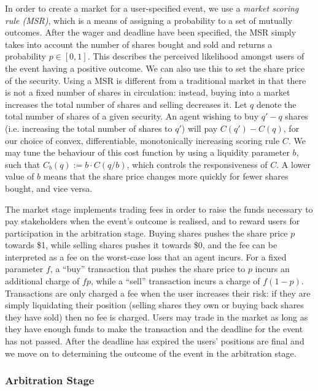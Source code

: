 \documentclass[10pt,a4paper]{article}
\theoremstyle{plain}
\theoremstyle{definition}
\begin{document}
In order to create a market for a user-specified event, we use a \emph{market
scoring rule (MSR)}, which is a means of assigning a probability to a set of
mutually outcomes. After the wager and deadline have been specified, the MSR
simply takes into account the number of shares bought and sold and returns a
probability $p \in [0,1]$. This describes the perceived likelihood amongst
users of the event having a positive outcome. We can also use this to set the
share price of the security.  Using a MSR is different from a traditional
market in that there is not a fixed number of shares in circulation: instead,
buying into a market increases the total number of shares and selling decreases
it. Let $q$ denote the total number of shares of a given security. An agent
wishing to buy $q'-q$ shares (i.e. increasing the total number of shares to
$q'$) will pay $C(q')-C(q)$, for our choice of convex, differentiable,
monotonically increasing scoring rule $C$. We may tune the behaviour of this
cost function by using a liquidity parameter $b$, such that $C_b(q) := b \cdot
C(q/b)$, which controls the responsiveness of $C$. A lower value of $b$ means
that the share price changes more quickly for fewer shares bought, and vice
versa.

The market stage implements trading fees in order to raise the funds necessary
to pay stakeholders when the event's outcome is realised, and to reward users
for participation in the arbitration stage. Buying shares pushes the share
price $p$ towards \$1, while selling shares pushes it towards \$0, and the fee
can be interpreted as a fee on the worst-case loss that an agent incurs. For a
fixed parameter $f$, a ``buy'' transaction that pushes the share price to $p$
incurs an additional charge of $fp$, while a ``sell'' transaction incurs a
charge of $f(1-p)$. Transactions are only charged a fee when the user increases
their risk: if they are simply liquidating their position (selling shares they
own or buying back shares they have sold) then no fee is charged.  Users may
trade in the market as long as they have enough funds to make the transaction
and the deadline for the event has not passed. After the deadline has expired
the users' positions are final and we move on to determining the outcome of the
event in the arbitration stage.

\subsubsection{Arbitration Stage}
\end{document}
